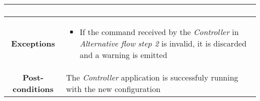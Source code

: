 \begin{longtable}{ |c|p{11.8cm}| }
{\begin{enumerate}
                    \end{enumerate}
                }\\ \hline
                \cellcolor[gray]{0.9} \textbf{Exceptions} & 
                    \begin{itemize}
                        \item If the command received by the \textit{Controller} in \textit{Alternative flow step 2} is invalid, it is discarded and a warning is emitted
                    \end{itemize}\\ \hline
                \cellcolor[gray]{0.9} \textbf{Post-conditions} & The \textit{Controller} application is successfuly running with the new configuration\\ \hline
            \end{longtable}

